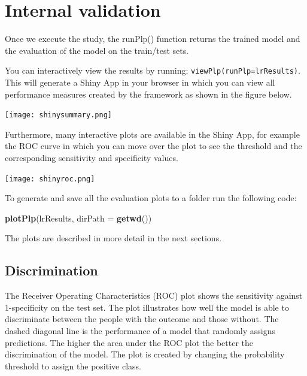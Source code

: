 \documentclass[
]{article}
\newenvironment{Shaded}{\begin{snugshade}}{\end{snugshade}}
\newcommand{\DataTypeTok}[1]{\textcolor[rgb]{0.13,0.29,0.53}{#1}}
\newcommand{\KeywordTok}[1]{\textcolor[rgb]{0.13,0.29,0.53}{\textbf{#1}}}
\newcommand{\NormalTok}[1]{#1}
\begin{document}
\hypertarget{internal-validation}{%
\section{Internal validation}\label{internal-validation}}

Once we execute the study, the runPlp() function returns the trained
model and the evaluation of the model on the train/test sets.

You can interactively view the results by running:
\texttt{viewPlp(runPlp=lrResults)}. This will generate a Shiny App in
your browser in which you can view all performance measures created by
the framework as shown in the figure below.

\texttt{[image: shinysummary.png]}

Furthermore, many interactive plots are available in the Shiny App, for
example the ROC curve in which you can move over the plot to see the
threshold and the corresponding sensitivity and specificity values.

\texttt{[image: shinyroc.png]}

To generate and save all the evaluation plots to a folder run the
following code:

\begin{Shaded}
\begin{Highlighting}[]
\KeywordTok{plotPlp}\NormalTok{(lrResults, }\DataTypeTok{dirPath =} \KeywordTok{getwd}\NormalTok{())}
\end{Highlighting}
\end{Shaded}

The plots are described in more detail in the next sections.

\newpage

\hypertarget{discrimination}{%
\subsection{Discrimination}\label{discrimination}}

The Receiver Operating Characteristics (ROC) plot shows the sensitivity
against 1-specificity on the test set. The plot illustrates how well the
model is able to discriminate between the people with the outcome and
those without. The dashed diagonal line is the performance of a model
that randomly assigns predictions. The higher the area under the ROC
plot the better the discrimination of the model. The plot is created by
changing the probability threshold to assign the positive class.
\end{document}
